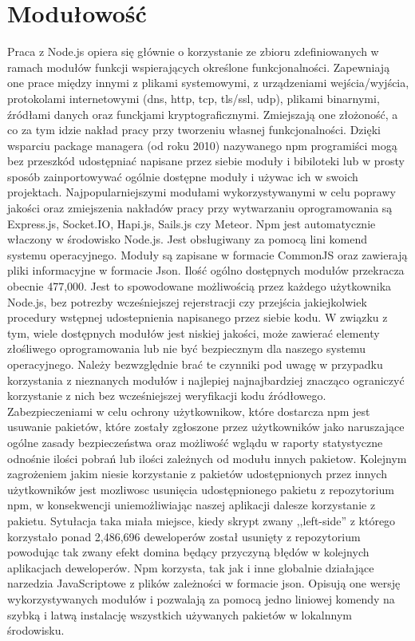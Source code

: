 \documentclass[12pt]{report}
\begin{document}
\section{Modułowość}
Praca z Node.js opiera się głównie o korzystanie ze zbioru zdefiniowanych w ramach modułów funkcji wspierających określone funkcjonalności. 
Zapewniają one prace między innymi z plikami systemowymi, z urządzeniami wejścia/wyjścia, protokolami internetowymi (dns, http, tcp, tls/ssl, udp), plikami binarnymi, źródłami danych oraz funckjami kryptograficznymi. 
Zmiejszają one złożoność, a co za tym idzie nakład pracy przy tworzeniu własnej funkcjonalności. 
Dzięki wsparciu package managera (od roku 2010) nazywanego npm programiści mogą bez przeszkód udostępniać napisane przez siebie moduły i bibiloteki lub w prosty sposób zainportowywać ogólnie dostępne moduły i używac ich w swoich projektach. 
Najpopularniejszymi modułami wykorzystywanymi w celu poprawy jakości oraz zmiejszenia nakładów pracy przy wytwarzaniu oprogramowania są Express.js, Socket.IO, Hapi.js, Sails.js czy Meteor. 
Npm jest automatycznie właczony w środowisko Node.js. 
Jest obsługiwany za pomocą lini komend systemu operacyjnego. 
Moduły są zapisane w formacie CommonJS oraz zawierają pliki informacyjne w formacie Json. 
Ilość ogólno dostępnych modułów przekracza obecnie 477,000. 
Jest to spowodowane możliwością przez każdego użytkownika Node.js, bez potrezby wcześniejszej rejerstracji czy przejścia jakiejkolwiek procedury wstępnej udostepnienia napisanego przez siebie kodu. 
W związku z tym, wiele dostępnych modułów jest niskiej jakości, może zawierać elementy złośliwego oprogramowania lub nie być bezpiecznym dla naszego systemu operacyjnego. 
Należy bezwzględnie brać te czynniki pod uwagę w przypadku korzystania z nieznanych modułów i najlepiej najnajbardziej znacząco ograniczyć korzystanie z nich bez wcześniejszej weryfikacji kodu źródłowego. 
Zabezpieczeniami w celu ochrony użytkownikow, które dostarcza npm jest usuwanie pakietów, które zostały zgłoszone przez użytkowników jako naruszające ogólne zasady bezpieczeństwa oraz możliwość wglądu w raporty statystyczne odnośnie ilości pobrań lub ilości zależnych od modułu innych pakietow. 
Kolejnym zagrożeniem jakim niesie korzystanie z pakietów udostępnionych przez innych użytkowników jest mozliwosc usunięcia udostępnionego pakietu z repozytorium npm, w konsekwencji uniemożliwiając naszej aplikacji dalesze korzystanie z pakietu. 
Sytułacja taka miała miejsce, kiedy skrypt zwany ,,left-side'' z którego korzystało ponad 2,486,696 deweloperów został usunięty z repozytorium powodując tak zwany efekt domina będący przyczyną błędów w kolejnych aplikacjach deweloperów. 
Npm korzysta, tak jak i inne globalnie działające narzedzia JavaScriptowe z plików zależności w formacie json. 
Opisują one wersję wykorzystywanych modułów i pozwalają za pomocą jedno liniowej komendy na szybką i latwą instalację wszystkich używanych pakietów w lokalnnym środowisku. 
\end{document}
